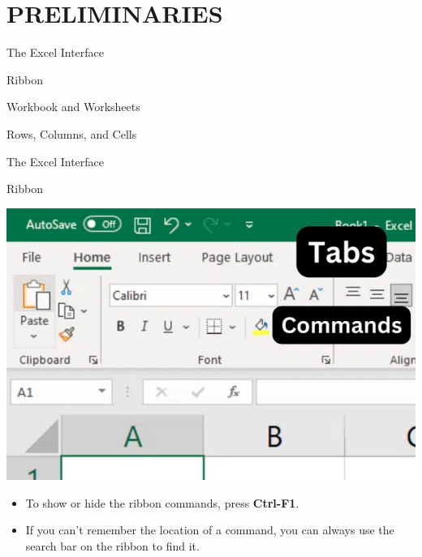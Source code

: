\documentclass[
  10pt,
  ignorenonframetext,
]{beamer}
\begin{document}
\hypertarget{preliminaries}{%
\section{PRELIMINARIES}\label{preliminaries}}

\begin{frame}{The Excel Interface}
\protect\hypertarget{the-excel-interface}{}
\begin{block}{Ribbon}
\protect\hypertarget{ribbon}{}
\end{block}

\begin{block}{Workbook and Worksheets}
\protect\hypertarget{workbook-and-worksheets}{}
\end{block}

\begin{block}{Rows, Columns, and Cells}
\protect\hypertarget{rows-columns-and-cells}{}
\end{block}
\end{frame}

\begin{frame}{The Excel Interface}
\protect\hypertarget{the-excel-interface-1}{}
\begin{block}{Ribbon}
\protect\hypertarget{ribbon-1}{}
\begin{center}\includegraphics[width=0.5\linewidth]{pictures/Excel-ribbon} \end{center}

\begin{itemize}
\item
  To show or hide the ribbon commands, press \textbf{Ctrl-F1}.
\item
  If you can't remember the location of a command, you can always use
  the search bar on the ribbon to find it.
\end{itemize}
\end{block}
\end{frame}
\end{document}
